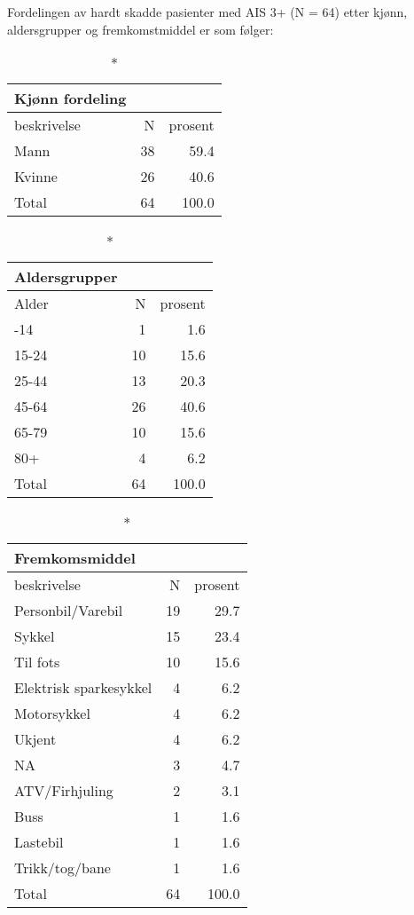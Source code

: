 \documentclass[
  letterpaper,
  DIV=11,
  numbers=noendperiod]{scrartcl}
\begin{document}
Fordelingen av hardt skadde pasienter med AIS 3+ (N = 64) etter kjønn,
aldersgrupper og fremkomstmiddel er som følger:

\begingroup
\fontsize{12.0pt}{14.4pt}\selectfont
\begin{longtable*}{lrr}
\caption*{
{\large Kjønn fordeling}
} \\ 
\toprule
beskrivelse & N & prosent \\ 
\midrule\addlinespace[2.5pt]
Mann & 38 & 59.4 \\ 
Kvinne & 26 & 40.6 \\ 
Total & 64 & 100.0 \\ 
\bottomrule
\end{longtable*}
\endgroup

\begingroup
\fontsize{12.0pt}{14.4pt}\selectfont
\begin{longtable*}{lrr}
\caption*{
{\large Aldersgrupper}
} \\ 
\toprule
Alder & N & prosent \\ 
\midrule{}-14 & 1 & 1.6 \\ 
15-24 & 10 & 15.6 \\ 
25-44 & 13 & 20.3 \\ 
45-64 & 26 & 40.6 \\ 
65-79 & 10 & 15.6 \\ 
80+ & 4 & 6.2 \\ 
Total & 64 & 100.0 \\ 
\bottomrule
\end{longtable*}
\endgroup

\begingroup
\fontsize{12.0pt}{14.4pt}\selectfont
\begin{longtable*}{lrr}
\caption*{
{\large Fremkomsmiddel}
} \\ 
\toprule
beskrivelse & N & prosent \\ 
\midrule\addlinespace[2.5pt]
Personbil/Varebil & 19 & 29.7 \\ 
Sykkel & 15 & 23.4 \\ 
Til fots & 10 & 15.6 \\ 
Elektrisk sparkesykkel & 4 & 6.2 \\ 
Motorsykkel & 4 & 6.2 \\ 
Ukjent & 4 & 6.2 \\ 
NA & 3 & 4.7 \\ 
ATV/Firhjuling & 2 & 3.1 \\ 
Buss & 1 & 1.6 \\ 
Lastebil & 1 & 1.6 \\ 
Trikk/tog/bane & 1 & 1.6 \\ 
Total & 64 & 100.0 \\ 
\bottomrule
\end{longtable*}
\endgroup
\end{document}
